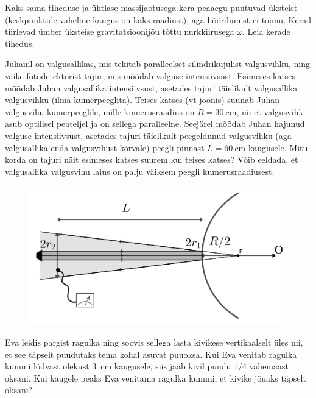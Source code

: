 \documentclass[10pt]{article}
\begin{document}

Kaks sama tiheduse ja ühtlase massijaotusega kera peaaegu puutuvad üksteist (keskpunktide vaheline kaugus on kaks raadiust), aga hõõrdumist ei toimu. Kerad tiirlevad ümber üksteise gravitatsioonijõu tõttu nurkkiirusega $\omega$. Leia kerade tihedus.
\probend
\bigskip


Juhanil on valgusallikas, mis tekitab paralleelset silindrikujulist valgusvihku, ning väike fotodetektorist tajur, mis mõõdab valguse intensiivsust. Esimeses katses mõõdab Juhan valgusallika intensiivsust, asetades tajuri täielikult valgusallika valgusvihku (ilma kumerpeeglita). Teises katses (vt joonis) suunab Juhan valgusvihu kumerpeeglile, mille kumerusraadius on $R=\SI{30}{\centi\m}$, nii et valgusvihk asub optilisel peateljel ja on sellega paralleelne. Seejärel mõõdab Juhan hajunud valguse intensiivsust, asetades tajuri täielikult peegeldunud valgusvihku (aga valgusallika enda valgusvihust kõrvale) peegli pinnast $L=\SI{60}{\centi\m}$ kaugusele. Mitu korda on tajuri näit esimeses katses suurem kui teises katses? Võib eeldada, et valgusallika valgusvihu laius on palju väiksem peegli kumerusraadiusest.

\begin{figure}[h]
    \centering
    \includegraphics[width=0.6\linewidth]{2024-v2g-02-yl.png}
\end{figure}
\probend
\bigskip


Eva leidis pargist ragulka ning soovis sellega lasta kivikese vertikaalselt üles nii, et see täpselt puudutaks tema kohal asuvat puuoksa. Kui Eva venitab ragulka kummi lõdvast olekust \SI{3}{\cm} kaugusele, siis jääb kivil puudu $1/4$ vahemaast oksani. Kui kaugele peaks Eva venitama ragulka kummi, et kivike jõuaks täpselt oksani?
\probend
\bigskip
\end{document}
